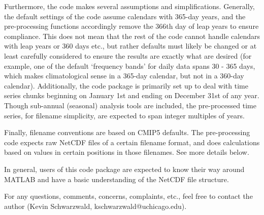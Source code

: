 \documentclass{article}
\begin{document}
Furthermore, the code makes several assumptions and simplifications. Generally, the default settings of the code assume calendars with 365-day years, and the pre-processing functions accordingly remove the 366th day of leap years to ensure compliance. This does not mean that the rest of the code cannot handle calendars with leap years or 360 days etc., but rather defaults must likely be changed or at least carefully considered to ensure the results are exactly what are desired (for example, one of the default `frequency bands' for daily data spans 30 - 365 days, which makes climatological sense in a 365-day calendar, but not in a 360-day calendar). Additionally, the code package is primarily set up to deal with time series chunks beginning on January 1st and ending on December 31st of any year. Though sub-annual (seasonal) analysis tools are included, the pre-processed time series, for filename simplicity, are expected to span integer multiples of years. 

Finally, filename conventions are based on CMIP5 defaults. The pre-processing code expects raw NetCDF files of a certain filename format, and does calculations based on values in certain positions in those filenames. See more details below. 

In general, users of this code package are expected to know their way around MATLAB and have a basic understanding of the NetCDF file structure. 

For any questions, comments, concerns, complaints, etc., feel free to contact the author (Kevin Schwarzwald, kschwarzwald@uchicago.edu). 
\end{document}
